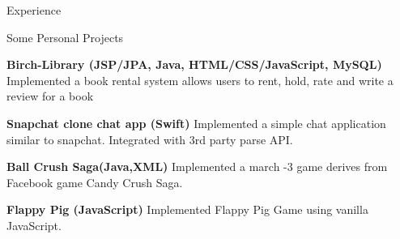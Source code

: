 \documentclass{resume} %
\begin{document}
\begin{rSection}{Experience}


\end{rSection}

\begin{rSection}{Some Personal Projects}

\item {\bf Birch-Library (JSP/JPA, Java, HTML/CSS/JavaScript, MySQL)} Implemented a book rental system allows users to rent, hold, rate and write a review for a book




\item {\bf Snapchat clone chat app (Swift)} Implemented a simple chat application similar to snapchat. Integrated with 3rd party parse API.



\item {\bf Ball Crush Saga(Java,XML)} Implemented a march -3 game derives from Facebook game Candy Crush Saga.





\item {\bf Flappy Pig (JavaScript)} Implemented Flappy Pig Game using vanilla JavaScript.

\end{rSection}
\end{document}
